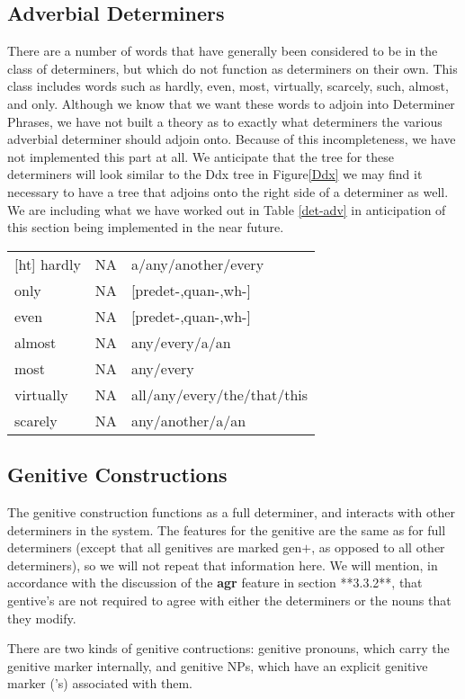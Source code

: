 \subsection{Adverbial Determiners}

There are a number of words that have generally been considered to be in the
class of determiners, but which do not function as determiners on their own.
This class includes words such as hardly, even, most, virtually, scarcely,
such, almost, and only.  Although we know that we want these words to adjoin
into Determiner Phrases, we have not built a theory as to exactly what
determiners the various adverbial determiner should adjoin onto.  Because of
this incompleteness, we have not implemented this part at all.  We anticipate
that the tree for these determiners will look similar to the Ddx tree in Figure\ref{Ddx}  we may find it necessary to have a tree that adjoins onto the
right side of a determiner as well.  We are including what we have worked out in Table \ref{det-adv}
in anticipation of this section being implemented in the near future.

\begin{tabular}{lll}[ht]
hardly&NA&a/any/another/every\\
only&NA&[predet-,quan-,wh-]\\
even&NA&[predet-,quan-,wh-]\\
almost&NA&any/every/a/an\\
most&NA&any/every\\
virtually&NA&all/any/every/the/that/this\\
scarely&NA&any/another/a/an\\
\end{tabular}
\label{det-adv}


\subsection{Genitive Constructions}

The genitive construction functions as a full determiner, and interacts with
other determiners in the system.  The features for the genitive are the same as
for full determiners (except that all genitives are marked gen$+$, as opposed to
all other determiners), so we will not repeat that information here.  We will
mention, in accordance with the discussion of the {\bf agr} feature in section
**3.3.2**, that gentive's are not required to agree with either the
determiners or the nouns that they modify.  

There are two kinds of genitive contructions: genitive pronouns, which carry
the genitive marker internally, and genitive NPs, which have an explicit
genitive marker ('s) associated with them.

